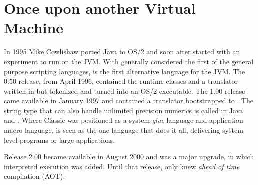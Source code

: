 \section{Once upon another Virtual Machine}
In 1995 Mike Cowlishaw ported Java\textsuperscript{\texttrademark} to OS/2\textsuperscript{\texttrademark} and soon after started with
an experiment to run \Rexx{} on the JVM\textsuperscript{\texttrademark}. With \Rexx{} generally considered
the first of the general purpose scripting languages, \nr{}\textsuperscript{\texttrademark}  is the
first alternative language for the JVM. The 0.50 release, from April
1996, contained the \nr{} runtime classes and a translator written
in \Rexx{} but tokenized and turned into an OS/2 executable. The 1.00
release came available in January 1997 and contained a translator
bootstrapped to \nr{}. The \Rexx{} string type that can also handle
unlimited precision numerics is called \Rexx{} in Java and \nr{}.
Where Classic \Rexx{} was positioned as a system \emph{glue} language and
application macro language, \nr{} is seen as the one language that
does it all, delivering system level programs or large applications.

Release 2.00 became available in August 2000 and was a major upgrade,
in which interpreted execution was added. Until that release, \nr{}
only knew \emph{ahead of time} compilation (AOT).

